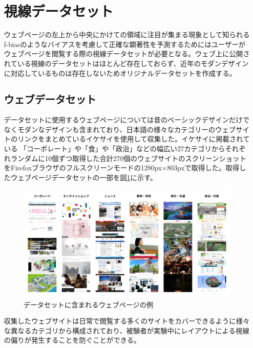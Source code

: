\newpage
\renewcommand{\baselinestretch}{1.5}
\section{視線データセット}
\renewcommand{\baselinestretch}{1}
\par ウェブページの左上から中央にかけての領域に注目が集まる現象として知られるf-biasのようなバイアスを考慮して正確な顕著性を予測するためにはユーザーがウェブページを閲覧する際の視線データセットが必要となる。ウェブ上に公開されている視線のデータセットはほとんど存在しておらず、近年のモダンデザインに対応しているものは存在しないためオリジナルデータセットを作成する。

\subsection{ウェブデータセット}\label{subsec:webdataset}
\par データセットに使用するウェブページについては昔のベーシックデザインだけでなくモダンなデザインも含まれており、日本語の様々なカテゴリーのウェブサイトのリンクをまとめているイケサイ\cite{ikesai}を使用して収集した。イケサイに掲載されている
「コーポレート」や「食」や「政治」などの幅広い27カテゴリからそれぞれランダムに10個ずつ取得した合計270個のウェブサイトのスクリーンショットをFirefoxブラウザのフルスクリーンモードの1280px×803pxで取得した。取得したウェブページデータセットの一部を図\ref{fig_webpage-dataset}に示す。

\begin{figure}[H]
  \centering
  \includegraphics[width=12.5cm]{figures/05_dataset.jpg}
  \caption{データセットに含まれるウェブページの例}
  \label{fig_webpage-dataset}
\end{figure}

\par 収集したウェブサイトは日常で閲覧する多くのサイトをカバーできるように様々な異なるカテゴリから構成されており、被験者が実験中にレイアウトによる視線の偏りが発生することを防ぐことができる。


